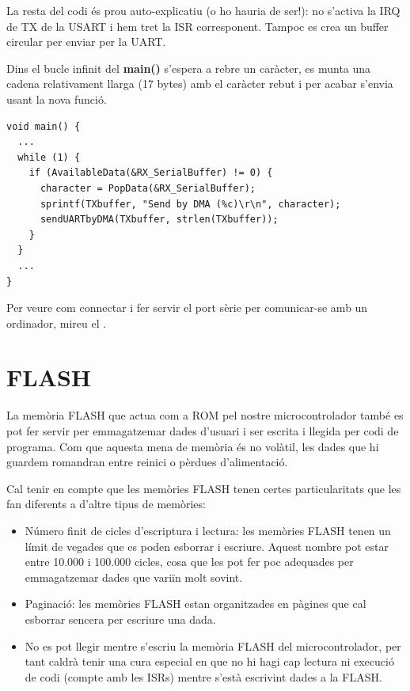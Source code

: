 La resta del codi és prou auto-explicatiu (o ho hauria de ser!): no s'activa la \gls{IRQ} de TX de la USART i hem tret la \gls{ISR} corresponent. Tampoc es crea un \gls{buffer circular} per enviar per la UART.

Dins el bucle infinit del {\bf main()} s'espera a rebre un caràcter, es munta una cadena relativament llarga (17 bytes) amb el caràcter rebut i per acabar s'envia usant la nova funció.
\begin{lstlisting}[style=customc, caption={Funció {\bf main()} de l'exemple}]
void main() {
  ...
  while (1) {
    if (AvailableData(&RX_SerialBuffer) != 0) {
      character = PopData(&RX_SerialBuffer);
      sprintf(TXbuffer, "Send by DMA (%c)\r\n", character);
      sendUARTbyDMA(TXbuffer, strlen(TXbuffer));
    }
  }
  ...
}
\end{lstlisting}

Per veure com connectar i fer servir el port sèrie per comunicar-se amb un ordinador, mireu el .

\chapter{FLASH}
\label{ch:FLASH}
La memòria \gls{FLASH} que actua com a \gls{ROM} pel nostre microcontrolador també es pot fer servir per emmagatzemar dades d'usuari i ser escrita i llegida per codi de programa. Com que aquesta mena de memòria és no volàtil, les dades que hi guardem romandran entre reinici o pèrdues d'alimentació.

Cal tenir en compte que les memòries FLASH tenen certes particularitats que les fan diferents a d'altre tipus de memòries:
\begin{itemize}
 \item Número finit de cicles d'escriptura i lectura: les memòries FLASH tenen un límit de vegades que es poden esborrar i escriure. Aquest nombre pot estar entre 10.000 i 100.000 cicles, cosa que les pot fer poc adequades per emmagatzemar dades que variïn molt sovint.
 \item Paginació: les memòries FLASH estan organitzades en pàgines que cal esborrar sencera per escriure una dada.
 \item No es pot llegir mentre s'escriu la memòria FLASH del microcontrolador, per tant caldrà tenir una cura especial en que no hi hagi cap lectura ni execució de codi (compte amb les \glspl{ISR}) mentre s'està escrivint dades a la FLASH.
\end{itemize}

